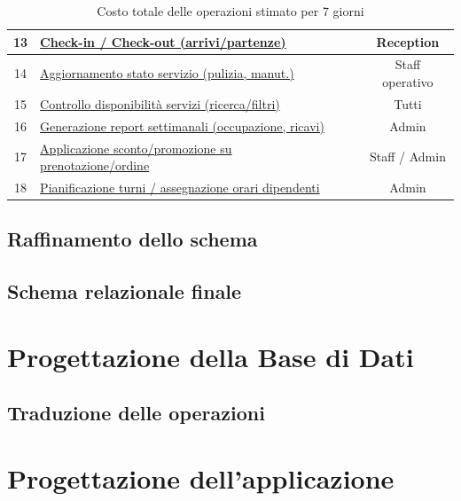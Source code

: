 \documentclass[a4paper,12pt]{report}
\begin{document}
\begin{table}[H]
\begin{tabularx}{\textwidth}{|c|>{\raggedright\arraybackslash}X|c|c|}
		\hline
		13          & \hyperref[op13]{Check-in / Check-out (arrivi/partenze)}                &                           & Reception              \\
		\hline
		14          & \hyperref[op14]{Aggiornamento stato servizio (pulizia, manut.)}        &                           & Staff operativo        \\
		\hline
		15          & \hyperref[op15]{Controllo disponibilità servizi (ricerca/filtri)}      &                           & Tutti                  \\
		\hline
		16          & \hyperref[op16]{Generazione report settimanali (occupazione, ricavi)}  &                           & Admin                  \\
		\hline
		17          & \hyperref[op17]{Applicazione sconto/promozione su prenotazione/ordine} &                           & Staff / Admin          \\
		\hline
		18          & \hyperref[op18]{Pianificazione turni / assegnazione orari dipendenti}  &                           & Admin                  \\
		\hline
	\end{tabularx}
	\caption{Costo totale delle operazioni stimato per 7 giorni}
	\label{tab:riepilogo-operazioni-settimanali}
\end{table}

\section{Raffinamento dello schema}

\section{Schema relazionale finale}

\chapter{Progettazione della Base di Dati}
\section{Traduzione delle operazioni}

\chapter{Progettazione dell'applicazione}
\end{document}
